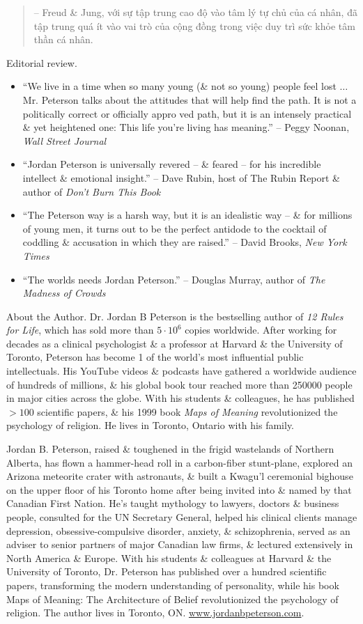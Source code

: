 \documentclass{article}
\begin{document}
\begin{enumerate}
\begin{quotation}
		-- {\sc Freud} \& {\sc Jung}, với sự tập trung cao độ vào tâm lý tự chủ của cá nhân, đã tập trung quá ít vào vai trò của cộng đồng trong việc duy trì sức khỏe tâm thần cá nhân.
	\end{quotation}
	{\sf Editorial review.}
	\begin{itemize}
		\item ``We live in a time when so many young (\& not so young) people feel lost $\ldots$ Mr. {\sc Peterson} talks about the attitudes that will help find the path. It is not a politically correct or officially appro ved path, but it is an intensely practical \& yet heightened one: This life you're living has meaning.'' -- {\sc Peggy Noonan}, {\it Wall Street Journal}
		\item ``{\sc Jordan Peterson} is universally revered -- \& feared -- for his incredible intellect \& emotional insight.'' -- {\sc Dave Rubin}, host of The Rubin Report \& author of {\it Don't Burn This Book}
		\item ``The Peterson way is a harsh way, but it is an idealistic way -- \& for millions of young men, it turns out to be the perfect antidode to the cocktail of coddling \& accusation in which they are raised.'' -- {\sc David Brooks}, {\it New York Times}
		\item ``The worlds needs {\sc Jordan Peterson}.'' -- {\sc Douglas Murray}, author of {\it The Madness of Crowds}
	\end{itemize}
	{\sf About the Author.} Dr. {\sc Jordan B Peterson} is the bestselling author of {\it12 Rules for Life}, which has sold more than $5\cdot10^6$ copies worldwide. After working for decades as a clinical psychologist \& a professor at Harvard \& the University of Toronto, Peterson has become 1 of the world's most influential public intellectuals. His YouTube videos \& podcasts have gathered a worldwide audience of hundreds of millions, \& his global book tour reached more than 250000 people in major cities across the globe. With his students \& colleagues, he has published $> 100$ scientific papers, \& his 1999 book {\it Maps of Meaning} revolutionized the psychology of religion. He lives in Toronto, Ontario with his family.
	
	{\sc Jordan B. Peterson}, raised \& toughened in the frigid wastelands of Northern Alberta, has flown a hammer-head roll in a carbon-fiber stunt-plane, explored an Arizona meteorite crater with astronauts, \& built a Kwagu'l ceremonial bighouse on the upper floor of his Toronto home after being invited into \& named by that Canadian First Nation. He's taught mythology to lawyers, doctors \& business people, consulted for the UN Secretary General, helped his clinical clients manage depression, obsessive-compulsive disorder, anxiety, \& schizophrenia, served as an adviser to senior partners of major Canadian law firms, \& lectured extensively in North America \& Europe. With his students \& colleagues at Harvard \& the University of Toronto, Dr. Peterson has published over a hundred scientific papers, transforming the modern understanding of personality, while his book Maps of Meaning: The Architecture of Belief revolutionized the psychology of religion. The author lives in Toronto, ON. \url{www.jordanbpeterson.com}.
	

\end{enumerate}
\end{document}
